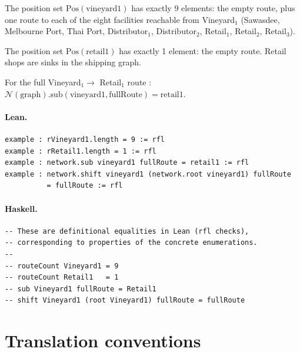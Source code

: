 \documentclass[11pt,a4paper]{article}
\begin{document}
\begin{prop}
The position set $\mathrm{Pos}(\mathrm{vineyard1})$ has exactly 9 elements:
the empty route, plus one route to each of the eight facilities reachable from
Vineyard$_1$ (Sawasdee, Melbourne Port, Thai Port, Distributor$_1$,
Distributor$_2$, Retail$_1$, Retail$_2$, Retail$_3$).
\end{prop}

\begin{prop}
The position set $\mathrm{Pos}(\mathrm{retail1})$ has exactly 1 element: the
empty route.  Retail shops are sinks in the shipping graph.
\end{prop}

\begin{prop}
For the full Vineyard$_1 \to$ Retail$_1$ route :
$\mathcal{N}(\text{graph}).\mathrm{sub}(\mathrm{vineyard1}, \mathrm{fullRoute})
= \mathrm{retail1}$.
\end{prop}

\paragraph{Lean.}
\begin{lstlisting}[style=lean]
example : rVineyard1.length = 9 := rfl
example : rRetail1.length = 1 := rfl
example : network.sub vineyard1 fullRoute = retail1 := rfl
example : network.shift vineyard1 (network.root vineyard1) fullRoute
          = fullRoute := rfl
\end{lstlisting}

\paragraph{Haskell.}
\begin{lstlisting}[style=haskell]
-- These are definitional equalities in Lean (rfl checks),
-- corresponding to properties of the concrete enumerations.
--
-- routeCount Vineyard1 = 9
-- routeCount Retail1   = 1
-- sub Vineyard1 fullRoute = Retail1
-- shift Vineyard1 (root Vineyard1) fullRoute = fullRoute
\end{lstlisting}


\section{Translation conventions}
\end{document}
